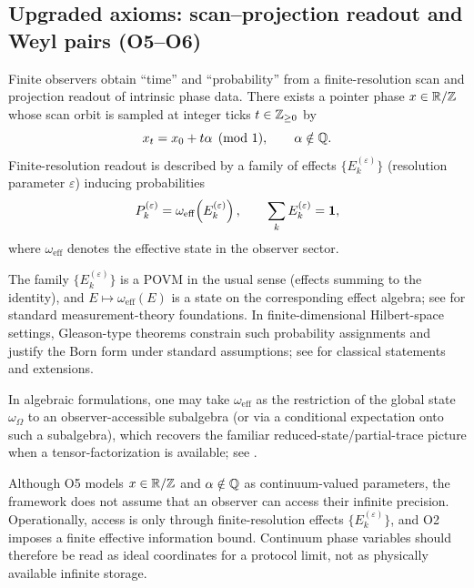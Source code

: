 \subsection{Upgraded axioms: scan--projection readout and Weyl pairs (O5--O6)}
\label{sec:axioms_O5_O6}

\begin{axiom}
Finite observers obtain ``time'' and ``probability'' from a finite-resolution scan and projection readout of intrinsic phase data. There exists a pointer phase $x\in\mathbb{R}/\mathbb{Z}$ whose scan orbit is sampled at integer ticks $t\in\mathbb{Z}_{\ge 0}$ by
\begin{equation}
x_t = x_0 + t\alpha \pmod 1,\qquad \alpha\notin\mathbb{Q}.
\end{equation}
Finite-resolution readout is described by a family of effects $\{E_k^{(\varepsilon)}\}$ (resolution parameter $\varepsilon$) inducing probabilities
\begin{equation}
P_k^{(\varepsilon)} = \omega_{\mathrm{eff}}\!\left(E_k^{(\varepsilon)}\right),\qquad \sum_k E_k^{(\varepsilon)}=\mathbf{1},
\end{equation}
where $\omega_{\mathrm{eff}}$ denotes the effective state in the observer sector.
\end{axiom}

\begin{remark}
The family $\{E_k^{(\varepsilon)}\}$ is a POVM in the usual sense (effects summing to the identity), and $E\mapsto \omega_{\mathrm{eff}}(E)$ is a state on the corresponding effect algebra; see \cite{Kraus1983,NielsenChuang2000} for standard measurement-theory foundations. In finite-dimensional Hilbert-space settings, Gleason-type theorems constrain such probability assignments and justify the Born form under standard assumptions; see \cite{Gleason1957,Busch2003} for classical statements and extensions.
\par
In algebraic formulations, one may take $\omega_{\mathrm{eff}}$ as the restriction of the global state $\omega_\Omega$ to an observer-accessible subalgebra (or via a conditional expectation onto such a subalgebra), which recovers the familiar reduced-state/partial-trace picture when a tensor-factorization is available; see \cite{BratteliRobinson1997,Haag1996}.
\end{remark}

\begin{remark}
Although O5 models $x\in\mathbb{R}/\mathbb{Z}$ and $\alpha\notin\mathbb{Q}$ as continuum-valued parameters, the framework does not assume that an observer can access their infinite precision. Operationally, access is only through finite-resolution effects $\{E_k^{(\varepsilon)}\}$, and O2 imposes a finite effective information bound. Continuum phase variables should therefore be read as ideal coordinates for a protocol limit, not as physically available infinite storage.
\end{remark}

